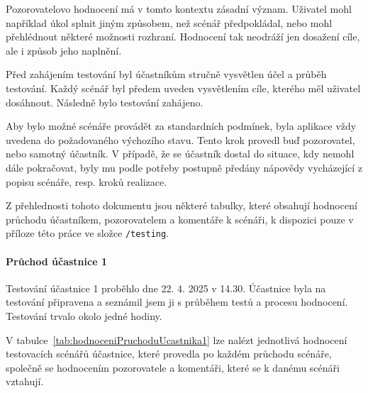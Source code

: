 Pozorovatelovo hodnocení má v tomto kontextu zásadní význam. 
Uživatel mohl například úkol splnit jiným způsobem, než scénář předpokládal, nebo mohl přehlédnout některé možnosti rozhraní. 
Hodnocení tak neodráží jen dosažení cíle, ale i způsob jeho naplnění.

Před zahájením testování byl účastníkům stručně vysvětlen účel a průběh testování. 
Každý scénář byl předem uveden vysvětlením cíle, kterého měl uživatel dosáhnout. 
Následně bylo testování zahájeno.

Aby bylo možné scénáře provádět za standardních podmínek, byla aplikace vždy uvedena do požadovaného výchozího stavu. 
Tento krok provedl buď pozorovatel, nebo samotný účastník. 
V případě, že se účastník dostal do situace, kdy nemohl dále pokračovat, byly mu podle potřeby postupně předány nápovědy vycházející z popisu scénáře, resp. kroků realizace.

Z přehlednosti tohoto dokumentu jsou některé tabulky, které obsahují hodnocení průchodu účastníkem, pozorovatelem a komentáře k scénáři, k dispozici pouze v příloze této práce ve složce \verb|/testing|.

\paragraph{Průchod účastnice 1}

Testování účastnice 1 proběhlo dne 22. 4. 2025 v 14.30. 
Účastnice byla na testování připravena a seznámil jsem ji s průběhem testů a procesu hodnocení. 
Testování trvalo okolo jedné hodiny.

V tabulce~\ref{tab:hodnoceniPruchoduUcastnika1} lze nalézt jednotlivá hodnocení testovacích scénářů účastnice, které provedla po každém průchodu scénáře, společně se hodnocením pozorovatele a komentáři, které se k danému scénáři vztahují.

